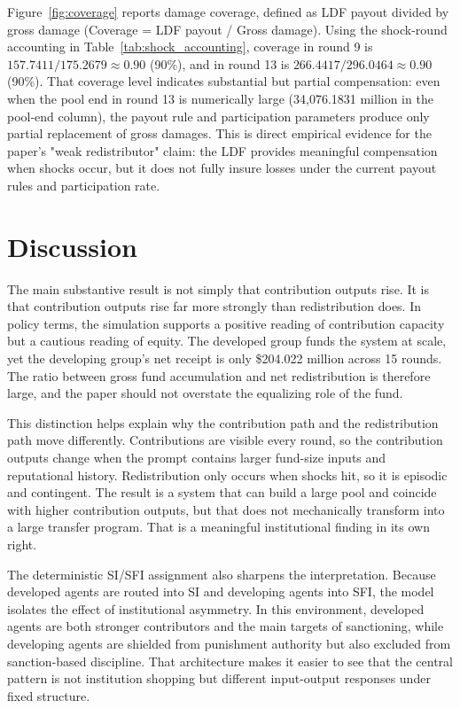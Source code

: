 \documentclass[12pt,letterpaper]{article}
\begin{document}
Figure~\ref{fig:coverage} reports damage coverage, defined as LDF payout divided by gross damage (Coverage = LDF payout / Gross damage). Using the shock-round accounting in Table~\ref{tab:shock_accounting}, coverage in round 9 is $157.7411/175.2679 \approx 0.90$ (90\%), and in round 13 is $266.4417/296.0464 \approx 0.90$ (90\%). That coverage level indicates substantial but partial compensation: even when the pool end in round 13 is numerically large (34,076.1831 million in the pool-end column), the payout rule and participation parameters produce only partial replacement of gross damages. This is direct empirical evidence for the paper's "weak redistributor" claim: the LDF provides meaningful compensation when shocks occur, but it does not fully insure losses under the current payout rules and participation rate.

\section{Discussion}

The main substantive result is not simply that contribution outputs rise. It is that contribution outputs rise far more strongly than redistribution does. In policy terms, the simulation supports a positive reading of contribution capacity but a cautious reading of equity. The developed group funds the system at scale, yet the developing group's net receipt is only \$204.022 million across 15 rounds. The ratio between gross fund accumulation and net redistribution is therefore large, and the paper should not overstate the equalizing role of the fund.

This distinction helps explain why the contribution path and the redistribution path move differently. Contributions are visible every round, so the contribution outputs change when the prompt contains larger fund-size inputs and reputational history. Redistribution only occurs when shocks hit, so it is episodic and contingent. The result is a system that can build a large pool and coincide with higher contribution outputs, but that does not mechanically transform into a large transfer program. That is a meaningful institutional finding in its own right.

The deterministic SI/SFI assignment also sharpens the interpretation. Because developed agents are routed into SI and developing agents into SFI, the model isolates the effect of institutional asymmetry. In this environment, developed agents are both stronger contributors and the main targets of sanctioning, while developing agents are shielded from punishment authority but also excluded from sanction-based discipline. That architecture makes it easier to see that the central pattern is not institution shopping but different input-output responses under fixed structure.
\end{document}
